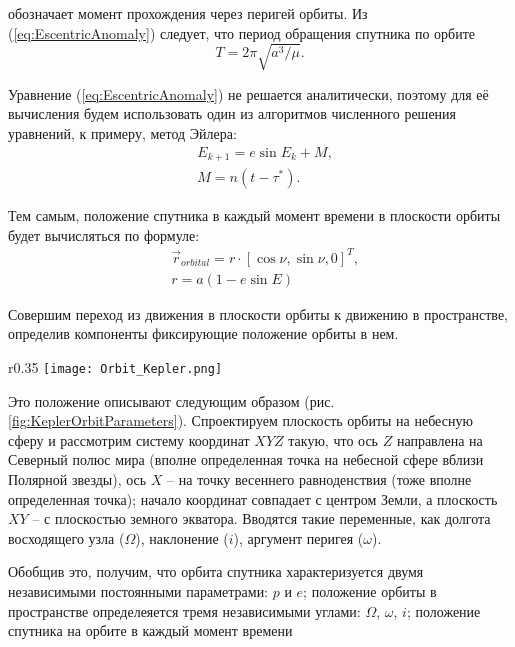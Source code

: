 обозначает момент прохождения через перигей орбиты. Из (\ref{eq:EscentricAnomaly})
следует, что период обращения спутника по орбите
\begin{equation}
  T = 2\pi\sqrt{a^3/\mu}.
\end{equation}\par
Уравнение (\ref{eq:EscentricAnomaly}) не решается аналитически, поэтому для её
вычисления будем использовать один из алгоритмов численного решения уравнений, к примеру,
метод Эйлера:
\begin{equation}
  \begin{aligned}
    & E_{k+1} = e\sin E_k + M, \\
    & M = n(t - \tau^*).
  \end{aligned}
\end{equation}\par
Тем самым, положение спутника в каждый момент времени в плоскости орбиты
будет вычисляться по формуле:
\begin{equation}
  \begin{aligned}
    & \vec{r}_{orbital} = r \cdot [\cos\nu, \sin\nu, 0]^{T}, \\
    & r = a(1 - e\sin E)
  \end{aligned}
\end{equation}\par
Совершим переход из движения в плоскости орбиты к движению в пространстве, определив
компоненты фиксирующие положение орбиты в нем.
\begin{wrapfigure}{r}{0.35\textwidth}
  \texttt{[image: Orbit\_Kepler.png]}
  \caption{Кеплеровы элементы}
  \label{fig:KeplerOrbitParameters}
\end{wrapfigure}
Это положение описывают следующим образом (рис. \ref{fig:KeplerOrbitParameters}).
Спроектируем плоскость орбиты на небесную сферу и рассмотрим систему координат $XYZ$
такую, что ось $Z$ направлена на Северный полюс мира (вполне определенная точка
на небесной сфере вблизи Полярной звезды), ось $X$ -- на точку весеннего
равноденствия (тоже вполне определенная точка); начало координат совпадает с
центром Земли, а плоскость $XY$ -- с плоскостью земного экватора.
Вводятся такие переменные, как долгота восходящего узла ($\Omega$), наклонение ($i$),
аргумент перигея ($\omega$).\par
Обобщив это, получим, что орбита спутника характеризуется двумя независимыми постоянными
параметрами: $p$ и $e$; положение орбиты в пространстве определеяется тремя независимыми
углами: $\Omega$, $\omega$, $i$; положение спутника на орбите в каждый момент времени

